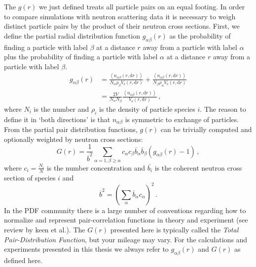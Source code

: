 The $g(r)$ we just defined treats all particle pairs on an equal footing. In order to compare simulations with neutron scattering data it is necessary to weigh distinct particle pairs by the product of their neutron cross sections. First, we define the partial radial distribution function $g_{\alpha\beta}(r)$ as the probability of finding a particle with label $\beta$ at a distance $r$ away from a particle with label $\alpha$ plus the probability of finding a particle with label $\alpha$ at a distance $r$ away from a particle with label $\beta$.
%
\begin{align*}
g_{\alpha\beta}(r) &= \frac{ \left\langle n_{\alpha\beta}(r,\mathrm{d}r) \right\rangle}{N_\alpha  \rho_\beta V_\text{s}(r,\mathrm{d}r)} + \frac{ \left\langle n_{\alpha\beta}(r,\mathrm{d}r) \right\rangle}{N_\beta \rho_\alpha V_\text{s}(r,\mathrm{d}r)} \\
&= \frac{2V}{N_\alpha N_\beta} \frac{ \left\langle n_{\alpha\beta}(r,\mathrm{d}r) \right\rangle}{V_\text{s}(r,\mathrm{d}r)} \, ,
\end{align*}
%
where $N_i$ is the number and $\rho_i$ is the density of particle species $i$. The reason to define it in `both directions' is that $n_{\alpha\beta}$ is symmetric to exchange of particles. From the partial pair distribution functions, $g(r)$ can be trivially computed and optionally weighted by neutron cross sections:
%
\[ G(r) = \frac{1}{\overline{b}^2} \sum_{\alpha=1,\beta\geq\alpha} c_\alpha c_\beta \overline{b}_\alpha \overline{b}_\beta (g_{\alpha\beta}(r) - 1) \, , \]
%
where $c_i = \frac{N_i}{N}$ is the number concentration and $\bar{b_i}$ is the coherent neutron cross section of species $i$ and 
%
\[ \overline{b}^2 = \left(\sum_\alpha \overline{b}_\alpha c_\alpha \right)^2 \, . \]
%
In the PDF community there is a large number of conventions regarding how to normalize and represent pair-correlation functions in theory and experiment (see review by keen et al.). The $G(r)$ presented here is typically called the \emph{Total Pair-Distribution Function}, but your mileage may vary. For the calculations and experiments presented in this thesis we always refer to $g_{\alpha\beta}(r)$ and $G(r)$ as defined here.

